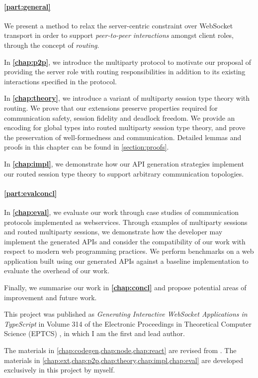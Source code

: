 \paragraph{\cref{part:general}} 
We present a method to relax the server-centric constraint over WebSocket
transport in order to support \textit{peer-to-peer interactions} 
amongst 
client roles, through the concept of \emph{routing}.

In \textbf{\cref{chap:p2p}}, 
we introduce the  multiparty
protocol to motivate our proposal of providing the server role with 
routing responsibilities in addition to its existing interactions
specified in the protocol.

In \textbf{\cref{chap:theory}}, 
we introduce a variant of multiparty 
session type theory with routing. We prove that our extensions preserve 
properties required for communication safety, 
session fidelity and deadlock freedom.
We provide an encoding for global types into routed multiparty 
session type theory, and prove the preservation of well-formedness
and communication. Detailed lemmas and proofs in this chapter can
be found in \cref{section:proofs}.

In \textbf{\cref{chap:impl}}, 
we demonstrate how our API generation strategies
implement our routed session type theory to support arbitrary communication
topologies.

\paragraph{\cref{part:evalconcl}}
In \textbf{\cref{chap:eval}}, 
we evaluate our work through 
case studies of communication protocols 
implemented as webservices. Through examples of
multiparty sessions and routed multiparty sessions, 
we demonstrate how the
developer may implement the generated APIs and 
consider the compatibility of our work with respect to
modern web programming practices.
We perform benchmarks on a web application built using our
generated APIs against a baseline implementation to evaluate
the overhead of our work.

Finally, we summarise our work in \textbf{\cref{chap:concl}} 
and propose potential
areas of improvement and future work.

\begin{remark}
This project was published as \emph{Generating Interactive WebSocket 
Applications in TypeScript} in Volume 314 of the Electronic Proceedings
in Theoretical Computer Science (EPTCS) \cite{PLACES2020},
in which I am the first and lead author.

The materials in \cref{chap:codegen,chap:node,chap:react}
are revised from \cite{PLACES2020}.
The materials in 
\cref{chap:ext,chap:p2p,chap:theory,chap:impl,chap:eval}
are developed exclusively in this project by myself.
\end{remark}